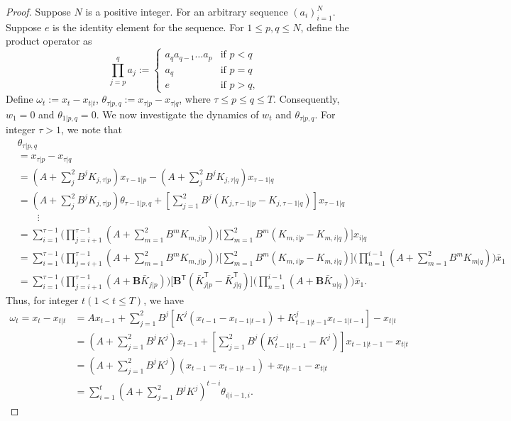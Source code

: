 \documentclass{article}
\begin{document}
\begin{proof}
    Suppose $N$ is a positive integer. For an arbitrary sequence $(a_{i})_{i=1}^{N}$. Suppose $e$ is the identity element for the sequence. For $1\leq p,q\leq N$, define the product operator as
\begin{equation}
    \prod_{j=p}^{q} a_{j} := 
    \begin{cases}
        a_{q}a_{q-1}\dots a_{p} & \text{if $p < q$}\\
        a_{q} & \text{if $p = q$}\\
        e & \text{if $p > q$},
    \end{cases}
\end{equation}
Define $\omega_{t} := x_{t}-x_{t|t}$, $\theta_{\tau| p,q} := x_{\tau|p}-x_{\tau|q}$, where $\tau \leq p\leq q\leq T$. Consequently, $w_{1} = 0$ and $\theta_{1|p,q}=0$. We now investigate the dynamics of $w_{t}$ and $\theta_{\tau|p,q}$. For integer $\tau > 1$, we note that
\begin{align*}
    &\theta_{\tau|p,q}\\
    &= x_{\tau|p}-x_{\tau|q}\\
    &= (A+\sum_{j}^{2}B^{j}K_{j,\tau|p})x_{\tau-1|p} - (A+\sum_{j}^{2}B^{j}K_{j,\tau|q})x_{\tau-1|q}\\
    &= (A+\sum_{j}^{2}B^{j}K_{j,\tau|p})\theta_{\tau-1|p,q} + [\sum_{j=1}^{2} B^{j}(K_{j,\tau-1|p}-K_{j,\tau-1|q})]x_{\tau-1|q}\\
    &\qquad \vdots\\
    &= \sum_{i=1}^{\tau-1}\bigg(\prod_{j=i+1}^{\tau-1}(A+\sum_{m=1}^{2}B^{m}K_{m,j|p})\bigg)\bigg[\sum_{m=1}^{2}B^{m}(K_{m,i|p}-K_{m,i|q})\bigg]x_{i|q}  \\
    &= \sum_{i=1}^{\tau-1}\bigg(\prod_{j=i+1}^{\tau-1}(A+\sum_{m=1}^{2}B^{m}K_{m,j|p})\bigg)\bigg[\sum_{m=1}^{2}B^{m}(K_{m,i|p}-K_{m,i|q})\bigg]\bigg(\prod_{n=1}^{i-1} (A+\sum_{m=1}^{2}B^{m}K_{m|q})\bigg)\bar{x}_{1}\\
    &= \sum_{i=1}^{\tau-1}\bigg(\prod_{j=i+1}^{\tau-1}(A+\mathbf{B}\bar{K}_{j|p})\bigg)\bigg[\mathbf{B}^{\mathsf{T}}(\bar{K}_{j|p}^{\mathsf{T}}-\bar{K}_{j|q}^{\mathsf{T}})\bigg]\bigg(\prod_{n=1}^{i-1} (A+\mathbf{B}\bar{K}_{n|q})\bigg)\bar{x}_{1}.
\end{align*}
Thus, for integer $t(1 < t\leq T)$, we have
\begin{align*}
    \omega_{t} = x_{t} - x_{t|t} &= Ax_{t-1} + \sum_{j=1}^{2}B^{j}[K^{j}(x_{t-1}-x_{t-1|t-1})+K_{t-1|t-1}^{j}x_{t-1|t-1}] - x_{t|t}\\
    &= (A+\sum_{j=1}^{2}B^{j}K^{j})x_{t-1} + [\sum_{j=1}^{2}B^{j}(K_{t-1|t-1}^{j}-K^{j})]x_{t-1|t-1} - x_{t|t}\\
    &= (A+\sum_{j=1}^{2}B^{j}K^{j})(x_{t-1}-x_{t-1|t-1}) + x_{t|t-1}-x_{t|t}\\
    &= \sum_{i=1}^{t} (A+\sum_{j=1}^{2}B^{j}K^{j})^{t-i} \theta_{i|i-1,i}.
\end{align*}


\end{proof}
\end{document}
